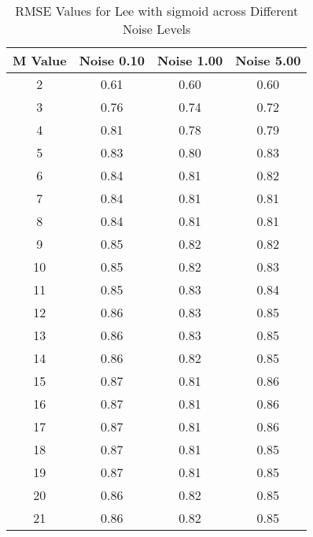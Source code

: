 \begin{table}[htb]
\small
\centering
\begin{tabular}{|c|c|c|c|} \hline
M Value & Noise 0.10 & Noise 1.00 & Noise 5.00 \\ \hline
2 & 0.61 & 0.60 & 0.60 \\ \hline
3 & 0.76 & 0.74 & 0.72 \\ \hline
4 & 0.81 & 0.78 & 0.79 \\ \hline
5 & 0.83 & 0.80 & 0.83 \\ \hline
6 & 0.84 & 0.81 & 0.82 \\ \hline
7 & 0.84 & 0.81 & 0.81 \\ \hline
8 & 0.84 & 0.81 & 0.81 \\ \hline
9 & 0.85 & 0.82 & 0.82 \\ \hline
10 & 0.85 & 0.82 & 0.83 \\ \hline
11 & 0.85 & 0.83 & 0.84 \\ \hline
12 & 0.86 & 0.83 & 0.85 \\ \hline
13 & 0.86 & 0.83 & 0.85 \\ \hline
14 & 0.86 & 0.82 & 0.85 \\ \hline
15 & 0.87 & 0.81 & 0.86 \\ \hline
16 & 0.87 & 0.81 & 0.86 \\ \hline
17 & 0.87 & 0.81 & 0.86 \\ \hline
18 & 0.87 & 0.81 & 0.85 \\ \hline
19 & 0.87 & 0.81 & 0.85 \\ \hline
20 & 0.86 & 0.82 & 0.85 \\ \hline
21 & 0.86 & 0.82 & 0.85 \\ \hline
\end{tabular}
\caption{RMSE Values for Lee with sigmoid across Different Noise Levels}
\end{table}

